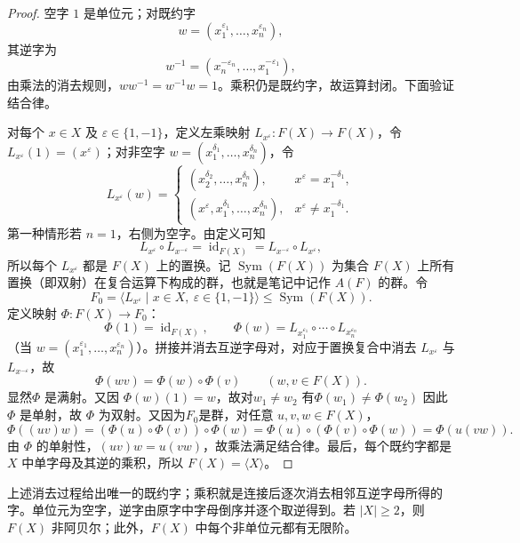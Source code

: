 \begin{proof}
空字 $1$ 是单位元；对既约字
\[
  w=(x_1^{\varepsilon_1},\ldots,x_n^{\varepsilon_n}),
\]
其逆字为
\[
  w^{-1}=(x_n^{-\varepsilon_n},\ldots,x_1^{-\varepsilon_1}),
\]
由乘法的消去规则，$ww^{-1}=w^{-1}w=1$。乘积仍是既约字，故运算封闭。下面验证结合律。

对每个 $x\in X$ 及 $\varepsilon\in\{1,-1\}$，定义左乘映射 $L_{x^{\varepsilon}}:F(X)\to F(X)$，令 $L_{x^{\varepsilon}}(1)=(x^{\varepsilon})$；对非空字 $w=(x_1^{\delta_1},\ldots,x_n^{\delta_n})$，令
\[
  L_{x^{\varepsilon}}(w)=
  \begin{cases}
    (x_2^{\delta_2},\ldots,x_n^{\delta_n}),
      & x^{\varepsilon}=x_1^{-\delta_1},\\[2pt]
    (x^{\varepsilon},x_1^{\delta_1},\ldots,x_n^{\delta_n}),
      & x^{\varepsilon}\neq x_1^{-\delta_1}.
  \end{cases}
\]
第一种情形若 $n=1$，右侧为空字。由定义可知
\[
  L_{x^{\varepsilon}}\circ L_{x^{-\varepsilon}}
  =\operatorname{id}_{F(X)}
  =L_{x^{-\varepsilon}}\circ L_{x^{\varepsilon}},
\]
所以每个 $L_{x^{\varepsilon}}$ 都是 $F(X)$ 上的置换。记 $\operatorname{Sym}(F(X))$ 为集合 $F(X)$ 上所有置换（即双射）在复合运算下构成的群，也就是笔记中记作 $A(F)$ 的群。令
\[
  F_0=\langle L_{x^{\varepsilon}}\mid x\in X,\ \varepsilon\in\{1,-1\}\rangle
  \leq\operatorname{Sym}(F(X)).
\]
定义映射 $\Phi:F(X)\to F_0$：
\[
  \Phi(1)=\operatorname{id}_{F(X)},\qquad
  \Phi(w)=L_{x_1^{\varepsilon_1}}\circ\cdots\circ L_{x_n^{\varepsilon_n}}
\]
（当 $w=(x_1^{\varepsilon_1},\ldots,x_n^{\varepsilon_n})$）。拼接并消去互逆字母对，对应于置换复合中消去 $L_{x^{\varepsilon}}$ 与 $L_{x^{-\varepsilon}}$，故
\[
  \Phi(wv)=\Phi(w)\circ\Phi(v)\qquad(w,v\in F(X)).
\]
显然$\Phi$ 是满射。又因 $\Phi(w)(1)=w$，故对$w_1 \neq w_2$ 有$\Phi(w_1) \neq \Phi(w_2)$ 因此$\Phi$ 是单射，故 $\Phi$ 为双射。又因为$F_0$是群，对任意 $u,v,w\in F(X)$，
\[
  \Phi((uv)w)
  =(\Phi(u)\circ\Phi(v))\circ\Phi(w)
  =\Phi(u)\circ(\Phi(v)\circ\Phi(w))
  =\Phi(u(vw)).
\]
由 $\Phi$ 的单射性，$(uv)w=u(vw)$，故乘法满足结合律。最后，每个既约字都是 $X$ 中单字母及其逆的乘积，所以 $F(X)=\langle X\rangle$。
\end{proof}

\begin{purplenote}
上述消去过程给出唯一的既约字；乘积就是连接后逐次消去相邻互逆字母所得的字。单位元为空字，逆字由原字中字母倒序并逐个取逆得到。若 $|X|\geq2$，则 $F(X)$ 非阿贝尔；此外，$F(X)$ 中每个非单位元都有无限阶。
\end{purplenote}

